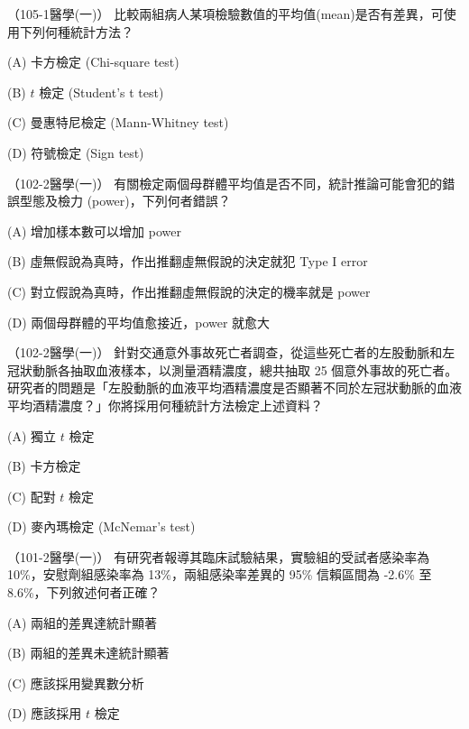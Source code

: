     \begin{docexam}{（105-1醫學(一)）}
        比較兩組病人某項檢驗數值的平均值(mean)是否有差異，可使用下列何種統計方法？

        (A) 卡方檢定 (Chi-square test)

        (B) $t$ 檢定 (Student's t test)

        (C) 曼惠特尼檢定 (Mann-Whitney test)

        (D) 符號檢定 (Sign test)
    \end{docexam}
    
    \begin{docexam}{（102-2醫學(一)）}
        有關檢定兩個母群體平均值是否不同，統計推論可能會犯的錯誤型態及檢力 (power)，下列何者錯誤？

        (A) 增加樣本數可以增加 power

        (B) 虛無假說為真時，作出推翻虛無假說的決定就犯 Type I error

        (C) 對立假說為真時，作出推翻虛無假說的決定的機率就是 power

        (D) 兩個母群體的平均值愈接近，power 就愈大
    \end{docexam}
    
    \begin{docexam}{（102-2醫學(一)）}
        針對交通意外事故死亡者調查，從這些死亡者的左股動脈和左冠狀動脈各抽取血液樣本，以測量酒精濃度，總共抽取 25 個意外事故的死亡者。研究者的問題是「左股動脈的血液平均酒精濃度是否顯著不同於左冠狀動脈的血液平均酒精濃度？」你將採用何種統計方法檢定上述資料？

        (A) 獨立 $t$ 檢定

        (B) 卡方檢定

        (C) 配對 $t$ 檢定

        (D) 麥內瑪檢定 (McNemar's test)
    \end{docexam}
    
    \begin{docexam}{（101-2醫學(一)）}
        有研究者報導其臨床試驗結果，實驗組的受試者感染率為 10\%，安慰劑組感染率為 13\%，兩組感染率差異的 95\% 信賴區間為 -2.6\% 至 8.6\%，下列敘述何者正確？        

        (A) 兩組的差異達統計顯著

        (B) 兩組的差異未達統計顯著

        (C) 應該採用變異數分析

        (D) 應該採用 $t$ 檢定
    \end{docexam}
    
